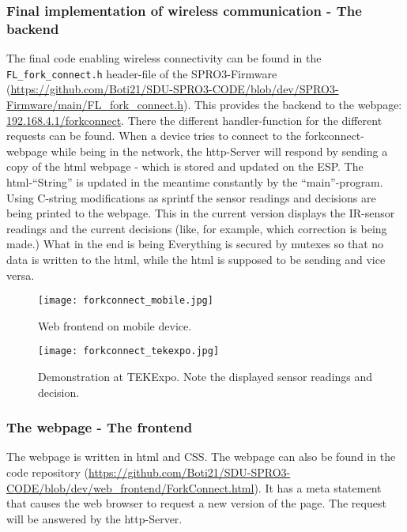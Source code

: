 \documentclass[../report.tex]{subfiles}
\begin{document}
\subsubsection{Final implementation of wireless communication - The backend}
The final code enabling wireless connectivity can be found in the 
\texttt{FL\_fork\_connect.h} header-file of the SPRO3-Firmware (\url{https://github.com/Boti21/SDU-SPRO3-CODE/blob/dev/SPRO3-Firmware/main/FL_fork_connect.h}).
This provides the backend to the webpage: \url{192.168.4.1/forkconnect}.
There the different handler-function for the different requests can be found.
When a device tries to connect to the forkconnect-webpage while being in the network,
the http-Server will respond by sending a copy of the html webpage - which is stored and updated on the ESP. The html-``String'' is updated in the 
meantime constantly by the ``main''-program. Using C-string modifications as sprintf the sensor readings
and decisions are being printed to the webpage. This in the current version displays the IR-sensor readings
and the current decisions (like, for example, which correction is being made.) What in the end is being 
Everything is secured by mutexes so that no data is written to the html, while the html is supposed
to be sending and vice versa. 
\begin{figure}[H]
    \centering
    \texttt{[image: forkconnect\_mobile.jpg]}
    \caption{Web frontend on mobile device.}
    
\end{figure} 
\begin{figure}[H]
    \centering
    \texttt{[image: forkconnect\_tekexpo.jpg]}
    \caption{Demonstration at TEKExpo. Note the displayed sensor readings and decision.}
\end{figure} 
\subsubsection{The webpage - The frontend}
The webpage is written in html and CSS. The webpage can also be found in the code 
repository (\url{https://github.com/Boti21/SDU-SPRO3-CODE/blob/dev/web_frontend/ForkConnect.html}).
It has a meta statement that causes the web browser to request a new version of the page.
The request will be answered by the http-Server. 
\end{document}
